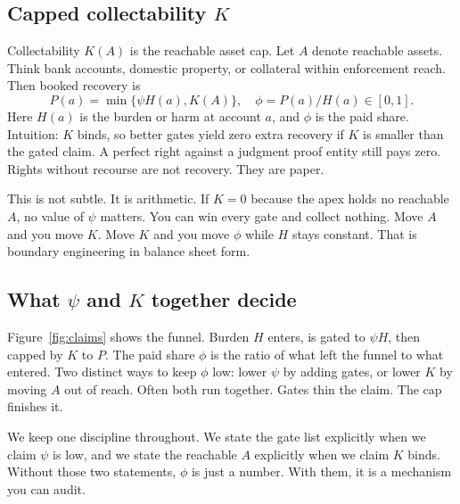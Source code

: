 \documentclass[11pt]{article}
\begin{document}
\subsection{Capped collectability \texorpdfstring{$K$}{K}}

Collectability $K(A)$ is the reachable asset cap. Let $A$ denote reachable assets. Think bank accounts, domestic property, or collateral within enforcement reach. Then booked recovery is
\begin{equation}
P(a) = \min\{\psi H(a), K(A)\},\quad \phi = P(a)/H(a) \in [0,1].
\label{eq:PK}
\end{equation}
Here $H(a)$ is the burden or harm at account $a$, and $\phi$ is the paid share. Intuition: $K$ binds, so better gates yield zero extra recovery if $K$ is smaller than the gated claim. A perfect right against a judgment proof entity still pays zero. Rights without recourse are not recovery. They are paper.

This is not subtle. It is arithmetic. If $K=0$ because the apex holds no reachable $A$, no value of $\psi$ matters. You can win every gate and collect nothing. Move $A$ and you move $K$. Move $K$ and you move $\phi$ while $H$ stays constant. That is boundary engineering in balance sheet form.

\subsection{What \texorpdfstring{$\psi$}{psi} and \texorpdfstring{$K$}{K} together decide}

Figure~\ref{fig:claims} shows the funnel. Burden $H$ enters, is gated to $\psi H$, then capped by $K$ to $P$. The paid share $\phi$ is the ratio of what left the funnel to what entered. Two distinct ways to keep $\phi$ low: lower $\psi$ by adding gates, or lower $K$ by moving $A$ out of reach. Often both run together. Gates thin the claim. The cap finishes it.

We keep one discipline throughout. We state the gate list explicitly when we claim $\psi$ is low, and we state the reachable $A$ explicitly when we claim $K$ binds. Without those two statements, $\phi$ is just a number. With them, it is a mechanism you can audit.
\end{document}
